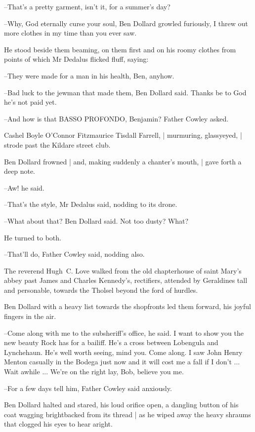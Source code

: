 --That's a pretty garment, isn't it,
for a summer's day?

--Why, God eternally curse your soul,
Ben Dollard growled furiously,
I
threw out more clothes in my time than you ever saw.

He stood beside them beaming,
on them first and on his roomy clothes
from
points of which Mr Dedalus flicked fluff,
saying:

--They were made for a man in his health, Ben, anyhow.

--Bad luck to the jewman that made them,
Ben Dollard said.
Thanks be to
God he's not paid yet.

--And how is that BASSO PROFONDO, Benjamin?
Father Cowley asked.

Cashel Boyle O'Connor Fitzmaurice Tisdall Farrell, |
murmuring, glassyeyed, |
strode past the Kildare street club.

Ben Dollard frowned |
and, making suddenly a chanter's mouth, |
gave forth a deep note.

--Aw!
he said.

--That's the style,
Mr Dedalus said,
nodding to its drone.

--What about that?
Ben Dollard said.
Not too dusty?
What?

He turned to both.

--That'll do,
Father Cowley said,
nodding also.

The reverend Hugh~C. Love
walked from the old chapterhouse of saint Mary's abbey
past James and Charles Kennedy's, rectifiers,
attended by Geraldines tall and personable,
towards the Tholsel beyond the ford of hurdles.

Ben Dollard
with a heavy list towards the shopfronts
led them forward,
his joyful fingers in the air.

--Come along with me to the subsheriff's office,
he said.
I want to show
you the new beauty Rock has for a bailiff.
He's a cross between Lobengula
and Lynchehaun.
He's well worth seeing, mind you.
Come along.
I saw John
Henry Menton casually in the Bodega just now
and it will cost me a fall
if I don't ...
Wait awhile ...
We're on the right lay, Bob, believe you
me.

--For a few days tell him,
Father Cowley said anxiously.

Ben Dollard halted and stared,
his loud orifice open,
a dangling button of his coat wagging brightbacked from its thread |
as he wiped away the heavy shraums that clogged his eyes
to hear aright.

